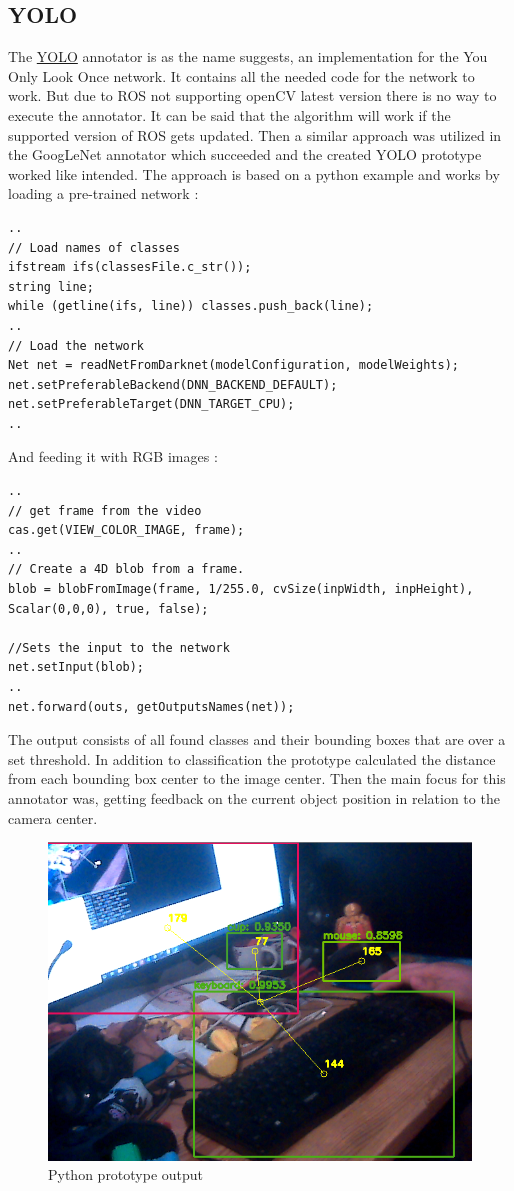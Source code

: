 \documentclass[main.tex]{subfiles}
\begin{document}
				\subsection{YOLO}
The \href{https://github.com/SUTURO/suturo_perception/blob/Handcamera_tracking/rs_Athene/src/Yolo.cpp}{YOLO} annotator is as the name suggests, an implementation for the You Only Look Once network. It contains all the needed code for the network to work.
But due to ROS not supporting openCV latest version there is no way to execute the annotator. It can be said that the algorithm will work if the supported version of ROS gets updated. Then a similar approach was utilized in the GoogLeNet annotator which succeeded and the created YOLO prototype worked like intended.
The approach is based on a python example and works by loading a pre-trained network : 
\begin{lstlisting}
..
// Load names of classes
ifstream ifs(classesFile.c_str());
string line;
while (getline(ifs, line)) classes.push_back(line);
..
// Load the network
Net net = readNetFromDarknet(modelConfiguration, modelWeights);
net.setPreferableBackend(DNN_BACKEND_DEFAULT);
net.setPreferableTarget(DNN_TARGET_CPU);
..
\end{lstlisting}
And feeding it with RGB images : 
\begin{lstlisting}
..
// get frame from the video
cas.get(VIEW_COLOR_IMAGE, frame);
..
// Create a 4D blob from a frame.
blob = blobFromImage(frame, 1/255.0, cvSize(inpWidth, inpHeight), Scalar(0,0,0), true, false);
        
//Sets the input to the network
net.setInput(blob);
..
net.forward(outs, getOutputsNames(net));
\end{lstlisting}

The output consists of all found classes and their bounding boxes that are over a set threshold.
In addition to classification the prototype calculated the distance from each bounding box center to the image center. 
Then the main focus for this annotator was, getting feedback on the current object position in relation to the camera center.

\begin{figure}[H]
\centering
\includegraphics[width=1\textwidth]{pictures/perception/YOLO.png}
\caption{Python prototype output}
\end{figure}
\end{document}
